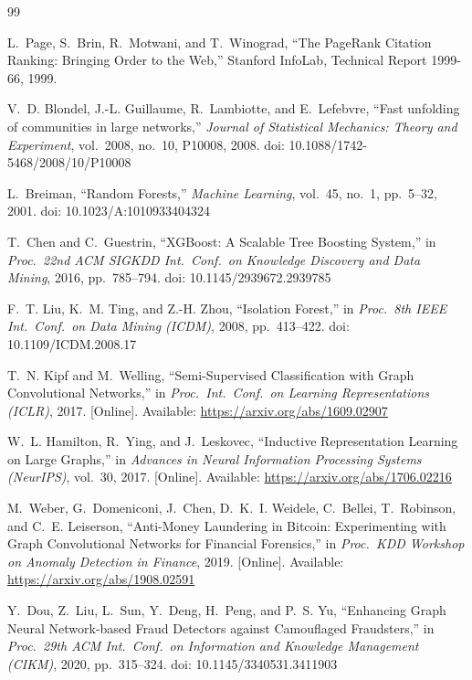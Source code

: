 \begin{thebibliography}{99}
\setlength{\itemsep}{4pt}

 L.~Page, S.~Brin, R.~Motwani, and T.~Winograd, ``The PageRank Citation Ranking: Bringing Order to the Web,'' Stanford InfoLab, Technical Report 1999-66, 1999.

 V.~D. Blondel, J.-L. Guillaume, R.~Lambiotte, and E.~Lefebvre, ``Fast unfolding of communities in large networks,'' \textit{Journal of Statistical Mechanics: Theory and Experiment}, vol.~2008, no.~10, P10008, 2008. doi: 10.1088/1742-5468/2008/10/P10008

 L.~Breiman, ``Random Forests,'' \textit{Machine Learning}, vol.~45, no.~1, pp.~5--32, 2001. doi: 10.1023/A:1010933404324

 T.~Chen and C.~Guestrin, ``XGBoost: A Scalable Tree Boosting System,'' in \textit{Proc.\ 22nd ACM SIGKDD Int.\ Conf.\ on Knowledge Discovery and Data Mining}, 2016, pp.~785--794. doi: 10.1145/2939672.2939785

 F.~T. Liu, K.~M. Ting, and Z.-H. Zhou, ``Isolation Forest,'' in \textit{Proc.\ 8th IEEE Int.\ Conf.\ on Data Mining (ICDM)}, 2008, pp.~413--422. doi: 10.1109/ICDM.2008.17

 T.~N. Kipf and M.~Welling, ``Semi-Supervised Classification with Graph Convolutional Networks,'' in \textit{Proc.\ Int.\ Conf.\ on Learning Representations (ICLR)}, 2017. [Online]. Available: \url{https://arxiv.org/abs/1609.02907}

 W.~L. Hamilton, R.~Ying, and J.~Leskovec, ``Inductive Representation Learning on Large Graphs,'' in \textit{Advances in Neural Information Processing Systems (NeurIPS)}, vol.~30, 2017. [Online]. Available: \url{https://arxiv.org/abs/1706.02216}

 M.~Weber, G.~Domeniconi, J.~Chen, D.~K.~I. Weidele, C.~Bellei, T.~Robinson, and C.~E. Leiserson, ``Anti-Money Laundering in Bitcoin: Experimenting with Graph Convolutional Networks for Financial Forensics,'' in \textit{Proc.\ KDD Workshop on Anomaly Detection in Finance}, 2019. [Online]. Available: \url{https://arxiv.org/abs/1908.02591}

 Y.~Dou, Z.~Liu, L.~Sun, Y.~Deng, H.~Peng, and P.~S. Yu, ``Enhancing Graph Neural Network-based Fraud Detectors against Camouflaged Fraudsters,'' in \textit{Proc.\ 29th ACM Int.\ Conf.\ on Information and Knowledge Management (CIKM)}, 2020, pp.~315--324. doi: 10.1145/3340531.3411903


\end{thebibliography}
